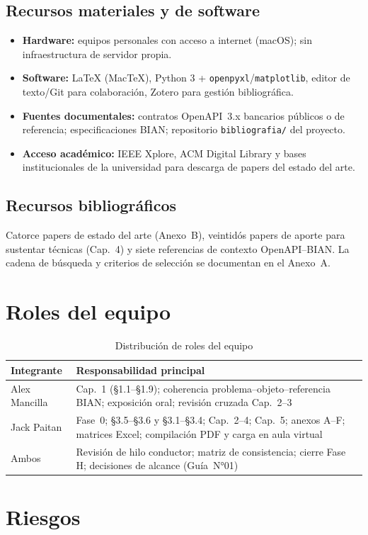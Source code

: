 \subsection{Recursos materiales y de software}

\begin{itemize}
  \item \textbf{Hardware:} equipos personales con acceso a internet (macOS); sin infraestructura
        de servidor propia.
  \item \textbf{Software:} \LaTeX{} (MacTeX), Python 3 + \texttt{openpyxl}/\texttt{matplotlib},
        editor de texto/Git para colaboración, Zotero para gestión bibliográfica.
  \item \textbf{Fuentes documentales:} contratos OpenAPI~3.x bancarios públicos o de referencia;
        especificaciones \ServiceDomain{} BIAN; repositorio \texttt{bibliografia/} del proyecto.
  \item \textbf{Acceso académico:} IEEE Xplore, ACM Digital Library y bases institucionales de la
        universidad para descarga de papers del estado del arte.
\end{itemize}

\subsection{Recursos bibliográficos}

Catorce papers de estado del arte (Anexo~B), veintidós papers de aporte para sustentar técnicas
(Cap.~4) y siete referencias de contexto OpenAPI--BIAN. La cadena de búsqueda y criterios de
selección se documentan en el Anexo~A.

\section{Roles del equipo}

\begin{table}[H]
  \centering
  \caption{Distribución de roles del equipo}
  \label{tab:roles}
  \small
  \begin{tabular}{@{}p{}p{}@{}}
    \toprule
    \textbf{Integrante} & \textbf{Responsabilidad principal} \\
    \midrule
    Alex Mancilla &
    Cap.~1 (§1.1--§1.9); coherencia problema--objeto--referencia BIAN; exposición oral;
    revisión cruzada Cap.~2--3 \\
    Jack Paitan &
    Fase~0; §3.5--§3.6 y §3.1--§3.4; Cap.~2--4; Cap.~5; anexos A--F; matrices Excel;
    compilación PDF y carga en aula virtual \\
    Ambos &
    Revisión de hilo conductor; matriz de consistencia; cierre Fase H; decisiones de alcance
    (Guía~N°01) \\
    \bottomrule
  \end{tabular}
\end{table}

\section{Riesgos}


